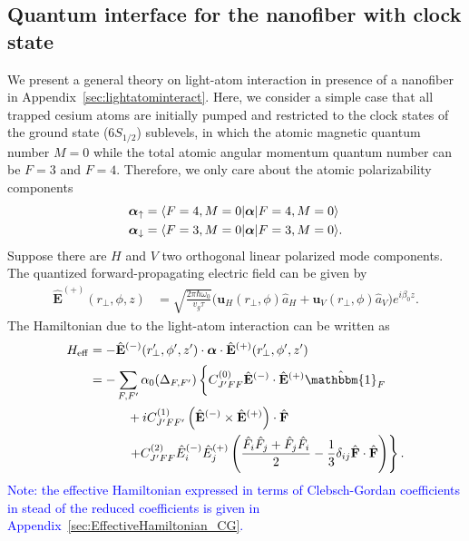 \documentclass[preprint,aps,pra,onecolumn]{revtex4-1} %
\renewcommand{\tensor}[1]{\boldsymbol{#1}}
\begin{document}



\subsection{Quantum interface for the nanofiber with clock state}
We present a general theory on light-atom interaction in presence of a nanofiber in Appendix~\ref{sec:lightatominteract}. Here, we consider a simple case that all trapped cesium atoms are initially pumped and restricted to the clock states of the ground state ($6S_{1/2}$) sublevels, in which the atomic magnetic quantum number $M=0$ while the total atomic angular momentum quantum number can be $F=3$ and $F=4$. Therefore, we only care about the atomic polarizability components
\begin{align}
\tensor{\alpha}_{\uparrow} &=\bra{F=4,M=0}\tensor{\alpha}\ket{F=4,M=0}\\
\tensor{\alpha}_{\downarrow} &=\bra{F=3,M=0}\tensor{\alpha}\ket{F=3,M=0}.
\end{align}
Suppose there are $H$ and $V$ two orthogonal linear polarized mode components. The quantized forward-propagating electric field can be given by
\begin{align}
\hat{\mathbf{E}}^{(+)}(r\!_\perp,\phi,z) &= \sqrt{ \frac{2 \pi \hbar \omega_0}{ v_g \tau} } \big( \mathbf{u}_H(r\!_\perp,\phi) \hat{a}_H + \mathbf{u}_V(r\!_\perp,\phi) \hat{a}_V \big) e^{i \beta_0 z}.
\end{align}
The Hamiltonian due to the light-atom interaction can be written as
\begin{align}
H_{\rm eff}   &= -\hat{\mathbf{E}}^{(-)}(r^\prime\!\!_\perp,\phi',z')\cdot \tensor{\alpha}\cdot 
\hat{\mathbf{E}}^{(+)}(r^\prime\!\!_\perp,\phi',z') \label{eq:Heff_0}\\
 &=- \sum_{F,F'}\alpha_0(\Delta_{F,F'}) \left\{ C_{J'FF}^{(0)} \hat{\mathbf{E}}^{(-)} \cdot \hat{\mathbf{E}}^{(+)} \hat{\mathbbm{1}}_F \phantom{\frac{\hat{1}}{1}}\right. \nonumber\\
&\quad\quad\quad + i C_{J'FF'}^{(1)} \left(\hat{\mathbf{E}}^{(-)} \times \hat{\mathbf{E}}^{(+)} \right) \cdot \hat{ \mathbf{F}} \nonumber\\
&\quad\quad\quad  \left. + C_{J'FF}^{(2)} \hat{E}_i^{(-)} \hat{E}_j^{(+)} \left( \frac{ \hat{F}_i \hat{F}_j  + \hat{F}_j \hat{F}_i  }{2} - \frac{1}{3}\delta_{ij} \hat{ \mathbf{F}} \cdot \hat{\mathbf{F}}  \right) \right\}. 
\end{align}
\textcolor{blue}{Note: the effective Hamiltonian expressed in terms of Clebsch-Gordan coefficients in 
stead of the reduced coefficients is given in Appendix~\ref{sec:EffectiveHamiltonian_CG}. }
\end{document}
